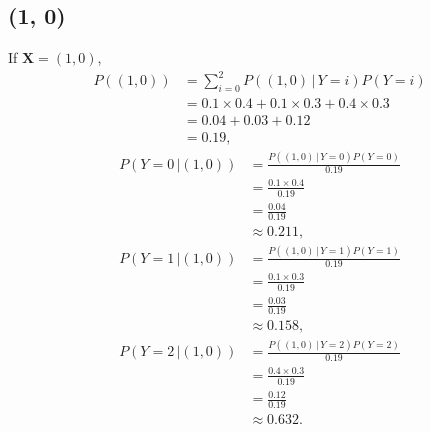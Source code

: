 \documentclass[10pt]{article}
\begin{document}
\subsection*{(1, 0)}
If $\textbf{X} = (1, 0)$, 
\begin{align*}
P((1, 0)) &= \sum_{i = 0}^2 P((1, 0) \, | \, Y = i)P(Y = i) \\
             &= 0.1 \times 0.4 + 0.1 \times 0.3 + 0.4 \times 0.3 \\
             &= 0.04 + 0.03 + 0.12 \\
             &= 0.19,
\end{align*}
\begin{align*}
P(Y = 0 \, | (1,0)) &= \frac{P((1, 0) \, | \, Y = 0)P(Y = 0)}{ 0.19 } \\
                           &= \frac{0.1 \times 0.4}{ 0.19 } \\
                           &= \frac{ 0.04 }{ 0.19 } \\
                           &\approx 0.211,
\end{align*}
\begin{align*}
P(Y = 1 \, | (1,0)) &= \frac{ P((1, 0) \, | \, Y = 1)P(Y = 1) }{ 0.19 } \\
                           &= \frac{ 0.1 \times 0.3 }{ 0.19 } \\
                           &= \frac{ 0.03 }{ 0.19 } \\
                           &\approx 0.158,
\end{align*}
\begin{align*}
P(Y = 2 \, | (1,0)) &= \frac{P((1, 0) \, | \, Y = 2)P(Y = 2)}{ 0.19 } \\
                           &= \frac{ 0.4 \times 0.3 }{ 0.19 } \\
                           &= \frac{ 0.12 }{ 0.19 } \\
                           &\approx 0.632.
\end{align*}
\end{document}
